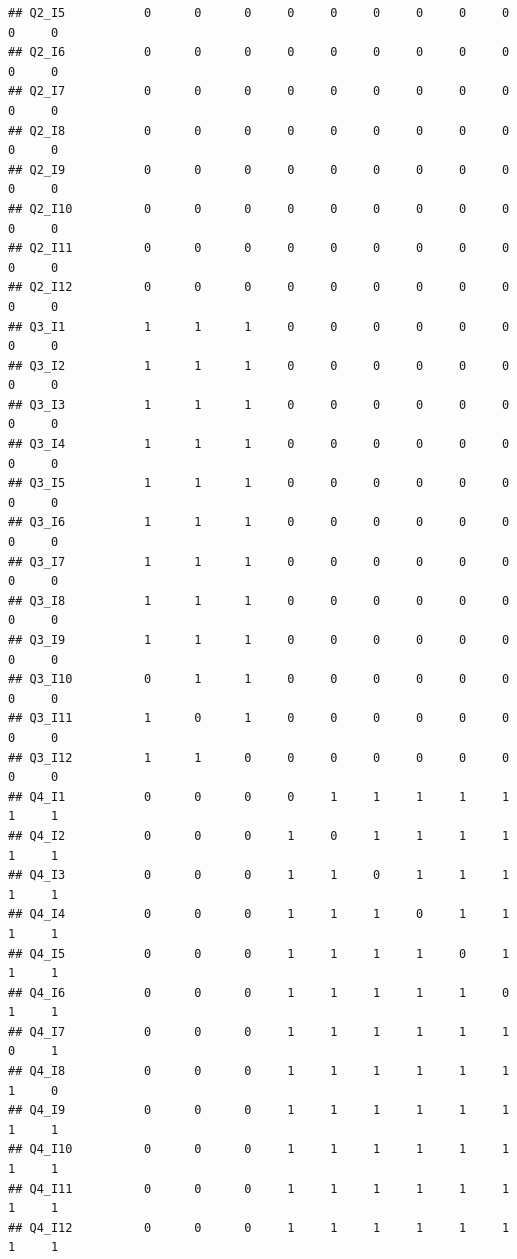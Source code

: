 \documentclass[
]{book}
\begin{document}
\begin{verbatim}
## Q2_I5           0      0      0     0     0     0     0     0     0     0     0
## Q2_I6           0      0      0     0     0     0     0     0     0     0     0
## Q2_I7           0      0      0     0     0     0     0     0     0     0     0
## Q2_I8           0      0      0     0     0     0     0     0     0     0     0
## Q2_I9           0      0      0     0     0     0     0     0     0     0     0
## Q2_I10          0      0      0     0     0     0     0     0     0     0     0
## Q2_I11          0      0      0     0     0     0     0     0     0     0     0
## Q2_I12          0      0      0     0     0     0     0     0     0     0     0
## Q3_I1           1      1      1     0     0     0     0     0     0     0     0
## Q3_I2           1      1      1     0     0     0     0     0     0     0     0
## Q3_I3           1      1      1     0     0     0     0     0     0     0     0
## Q3_I4           1      1      1     0     0     0     0     0     0     0     0
## Q3_I5           1      1      1     0     0     0     0     0     0     0     0
## Q3_I6           1      1      1     0     0     0     0     0     0     0     0
## Q3_I7           1      1      1     0     0     0     0     0     0     0     0
## Q3_I8           1      1      1     0     0     0     0     0     0     0     0
## Q3_I9           1      1      1     0     0     0     0     0     0     0     0
## Q3_I10          0      1      1     0     0     0     0     0     0     0     0
## Q3_I11          1      0      1     0     0     0     0     0     0     0     0
## Q3_I12          1      1      0     0     0     0     0     0     0     0     0
## Q4_I1           0      0      0     0     1     1     1     1     1     1     1
## Q4_I2           0      0      0     1     0     1     1     1     1     1     1
## Q4_I3           0      0      0     1     1     0     1     1     1     1     1
## Q4_I4           0      0      0     1     1     1     0     1     1     1     1
## Q4_I5           0      0      0     1     1     1     1     0     1     1     1
## Q4_I6           0      0      0     1     1     1     1     1     0     1     1
## Q4_I7           0      0      0     1     1     1     1     1     1     0     1
## Q4_I8           0      0      0     1     1     1     1     1     1     1     0
## Q4_I9           0      0      0     1     1     1     1     1     1     1     1
## Q4_I10          0      0      0     1     1     1     1     1     1     1     1
## Q4_I11          0      0      0     1     1     1     1     1     1     1     1
## Q4_I12          0      0      0     1     1     1     1     1     1     1     1

\end{verbatim}
\end{document}
